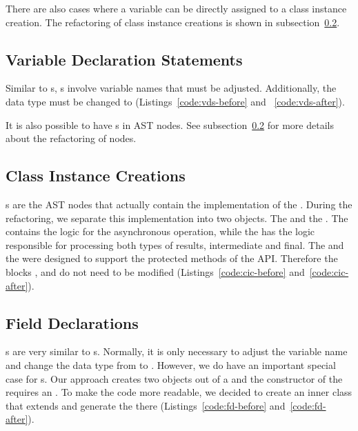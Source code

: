\documentclass[type=bsc,accentcolor=tud9c]{tudthesis}
\begin{document}


There are also cases where a variable can be directly assigned to a class instance creation. The refactoring of class instance creations is shown in subsection~\ref{sec:imp-class-instance-creations}.

\subsection{Variable Declaration Statements}
Similar to s, s involve variable names that must be adjusted. Additionally, the data type  must be changed to  (Listings~\ref{code:vds-before} and ~\ref{code:vds-after}).



It is also possible to have s in  AST nodes. See subsection~\ref{sec:imp-class-instance-creations} for more details about the refactoring of  nodes.

\subsection{Class Instance Creations}
\label{sec:imp-class-instance-creations}
s are the AST nodes that actually contain the implementation of the . During the refactoring, we separate this implementation into two objects. The  and the . The  contains the logic for the asynchronous operation, while the  has the logic responsible for processing both types of results, intermediate and final. The  and the  were designed to support the protected methods of the  API. Therefore the blocks ,  and  do not need to be modified (Listings~\ref{code:cic-before} and~\ref{code:cic-after}).



\subsection{Field Declarations}
s are very similar to s. Normally, it is only necessary to adjust the variable name and change the data type from  to . However, we do have an important special case for s. Our approach creates two objects out of a  and the constructor of the  requires an . To make the code more readable, we decided to create an inner class that extends  and generate the  there (Listings~\ref{code:fd-before} and~\ref{code:fd-after}).
\end{document}

